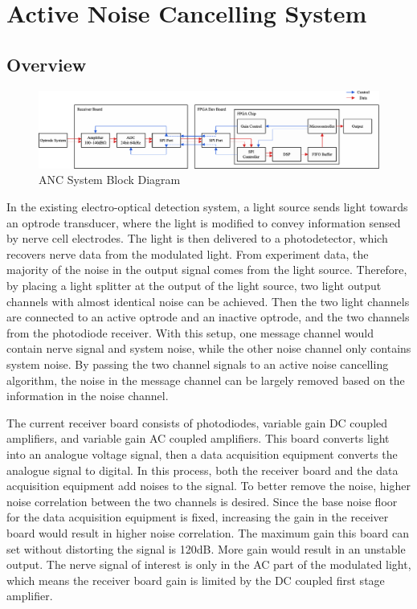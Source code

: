 \chapter[Active noise cancelling design]{Active Noise Cancelling System} \label{c:tc1} 

\section{Overview}

\begin{figure}[h]
\centering
\includegraphics[width=0.9\linewidth]{4-ANC_Sys/ANCBlockDiagram.pdf}
\caption{ANC System Block Diagram}
\label{fig_ANCBlockDiagram}
\end{figure}

In the existing electro-optical detection system, a light source sends light towards an optrode transducer, where the light is modified to convey information sensed by nerve cell electrodes. The light is then delivered to a photodetector, which recovers nerve data from the modulated light.  From experiment data, the majority of the noise in the output signal comes from the light source.  Therefore, by placing a light splitter at the output of the light source, two light output channels with almost identical noise can be achieved.  Then the two light channels are connected to an active optrode and an inactive optrode, and the two channels from the photodiode receiver.  With this setup, one message channel would contain nerve signal and system noise, while the other noise channel only contains system noise.  By passing the two channel signals to an active noise cancelling algorithm, the noise in the message channel can be largely removed based on the information in the noise channel.

The current receiver board consists of photodiodes, variable gain DC coupled amplifiers, and variable gain AC coupled amplifiers.  This board converts light into an analogue voltage signal, then a data acquisition equipment converts the analogue signal to digital.  In this process, both the receiver board and the data acquisition equipment add noises to the signal.  To better remove the noise, higher noise correlation between the two channels is desired.  Since the base noise floor for the data acquisition equipment is fixed, increasing the gain in the receiver board would result in higher noise correlation.  The maximum gain this board can set without distorting the signal is 120dB.  More gain would result in an unstable output.  The nerve signal of interest is only in the AC part of the modulated light, which means the receiver board gain is limited by the DC coupled first stage amplifier.  

